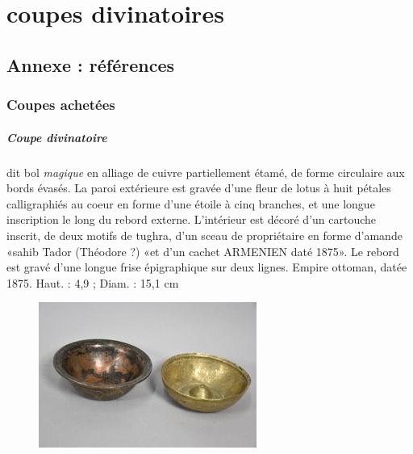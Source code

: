 \chapter{coupes divinatoires}



 

\section{Annexe : références}


\subsection{Coupes achetées}


\paragraph{Coupe divinatoire} dit bol \textit{magique} en alliage de cuivre partiellement étamé, de forme circulaire aux bords évasés. La paroi extérieure est gravée d'une fleur de lotus à huit pétales calligraphiés au coeur en forme d'une étoile à cinq branches, et une longue inscription le long du rebord externe. L'intérieur est décoré d'un cartouche inscrit, de deux motifs de tughra, d'un sceau de propriétaire en forme d'amande «sahib Tador (Théodore ?) «et d'un cachet ARMENIEN daté 1875». Le rebord est gravé d'une longue frise épigraphique sur deux lignes. Empire ottoman, datée 1875.
Haut. : 4,9 ; Diam. : 15,1 cm
\begin{figure}[h!]
    \centering
 \includegraphics[width=\textwidth]{GénéralISTR/Image/bolsmagiques.jpeg}


    \label{fig:my_label}
\end{figure}


